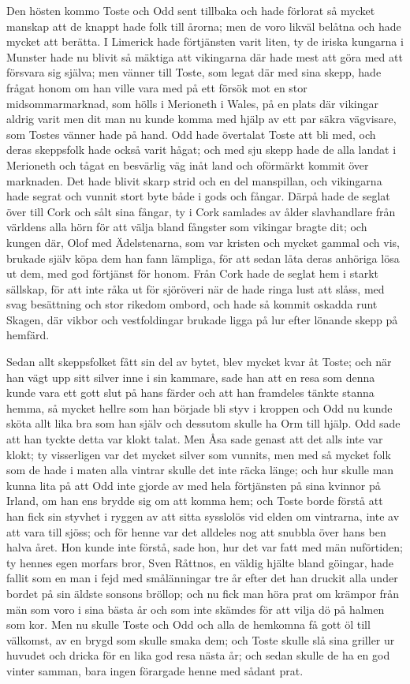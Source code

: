\initial Den hösten kommo Toste och Odd sent tillbaka och hade förlorat så mycket manskap att de knappt hade folk till årorna; men de voro likväl belåtna och hade mycket att berätta. I Limerick hade förtjänsten varit liten, ty de iriska kungarna i Munster hade nu blivit så mäktiga att vikingarna där hade mest att göra med att försvara sig själva; men vänner till Toste, som legat där med sina skepp, hade frågat honom om han ville vara med på ett försök mot en stor midsommarmarknad, som hölls i Merioneth i Wales, på en plats där vikingar aldrig varit men dit man nu kunde komma med hjälp av ett par säkra vägvisare, som Tostes vänner hade på hand. Odd hade övertalat Toste att bli med, och deras skeppsfolk hade också varit hågat; och med sju skepp hade de alla landat i Merioneth och tågat en besvärlig väg inåt land och oförmärkt kommit över marknaden. Det hade blivit skarp strid och en del manspillan, och vikingarna hade segrat och vunnit stort byte både i gods och fångar. Därpå hade de seglat över till Cork och sålt sina fångar, ty i Cork samlades av ålder slavhandlare från världens alla hörn för att välja bland fångster som vikingar bragte dit; och kungen där, Olof med Ädelstenarna, som var kristen och mycket gammal och vis, brukade själv köpa dem han fann lämpliga, för att sedan låta deras anhöriga lösa ut dem, med god förtjänst för honom. Från Cork hade de seglat hem i starkt sällskap, för att inte råka ut för sjöröveri när de hade ringa lust att slåss, med svag besättning och stor rikedom ombord, och hade så kommit oskadda runt Skagen, där vikbor och vestfoldingar brukade ligga på lur efter lönande skepp på hemfärd.

\initial Sedan allt skeppsfolket fått sin del av bytet, blev mycket kvar åt Toste; och när han vägt upp sitt silver inne i sin kammare, sade han att en resa som denna kunde vara ett gott slut på hans färder och att han framdeles tänkte stanna hemma, så mycket hellre som han började bli styv i kroppen och Odd nu kunde sköta allt lika bra som han själv och dessutom skulle ha Orm till hjälp. Odd sade att han tyckte detta var klokt talat. Men Åsa sade genast att det alls inte var klokt; ty visserligen var det mycket silver som vunnits, men med så mycket folk som de hade i maten alla vintrar skulle det inte räcka länge; och hur skulle man kunna lita på att Odd inte gjorde av med hela förtjänsten på sina kvinnor på Irland, om han ens brydde sig om att komma hem; och Toste borde förstå att han fick sin styvhet i ryggen av att sitta sysslolös vid elden om vintrarna, inte av att vara till sjöss; och för henne var det alldeles nog att snubbla över hans ben halva året. Hon kunde inte förstå, sade hon, hur det var fatt med män nuförtiden; ty hennes egen morfars bror, Sven Råttnos, en väldig hjälte bland göingar, hade fallit som en man i fejd med smålänningar tre år efter det han druckit alla under bordet på sin äldste sonsons bröllop; och nu fick man höra prat om krämpor från män som voro i sina bästa år och som inte skämdes för att vilja dö på halmen som kor. Men nu skulle Toste och Odd och alla de hemkomna få gott öl till välkomst, av en brygd som skulle smaka dem; och Toste skulle slå sina griller ur huvudet och dricka för en lika god resa nästa år; och sedan skulle de ha en god vinter samman, bara ingen förargade henne med sådant prat.

